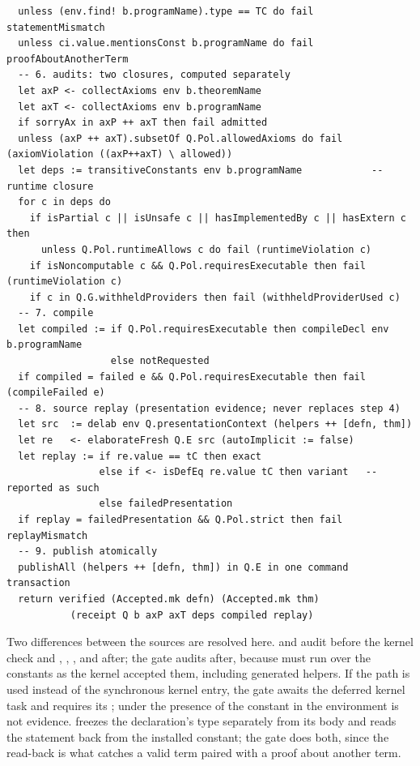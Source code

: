 \begin{lstlisting}
  unless (env.find! b.programName).type == TC do fail statementMismatch
  unless ci.value.mentionsConst b.programName do fail proofAboutAnotherTerm
  -- 6. audits: two closures, computed separately
  let axP <- collectAxioms env b.theoremName
  let axT <- collectAxioms env b.programName
  if sorryAx in axP ++ axT then fail admitted
  unless (axP ++ axT).subsetOf Q.Pol.allowedAxioms do fail (axiomViolation ((axP++axT) \ allowed))
  let deps := transitiveConstants env b.programName            -- runtime closure
  for c in deps do
    if isPartial c || isUnsafe c || hasImplementedBy c || hasExtern c then
      unless Q.Pol.runtimeAllows c do fail (runtimeViolation c)
    if isNoncomputable c && Q.Pol.requiresExecutable then fail (runtimeViolation c)
    if c in Q.G.withheldProviders then fail (withheldProviderUsed c)
  -- 7. compile
  let compiled := if Q.Pol.requiresExecutable then compileDecl env b.programName
                  else notRequested
  if compiled = failed e && Q.Pol.requiresExecutable then fail (compileFailed e)
  -- 8. source replay (presentation evidence; never replaces step 4)
  let src  := delab env Q.presentationContext (helpers ++ [defn, thm])
  let re   <- elaborateFresh Q.E src (autoImplicit := false)
  let replay := if re.value == tC then exact
                else if <- isDefEq re.value tC then variant   -- reported as such
                else failedPresentation
  if replay = failedPresentation && Q.Pol.strict then fail replayMismatch
  -- 9. publish atomically
  publishAll (helpers ++ [defn, thm]) in Q.E in one command transaction
  return verified (Accepted.mk defn) (Accepted.mk thm)
           (receipt Q b axP axT deps compiled replay)
\end{lstlisting}

Two differences between the sources are resolved here.  and  audit before the kernel check and , , , and  after; the gate audits after, because  must run over the constants as the kernel accepted them, including generated helpers. If the   path is used instead of the synchronous kernel entry, the gate awaits the deferred kernel task and requires its ; under  the presence of the constant in the environment is not evidence\cite{forge}.  freezes the declaration's type separately from its body and  reads the statement back from the installed constant; the gate does both, since the read-back is what catches a valid term paired with a proof about another term.

